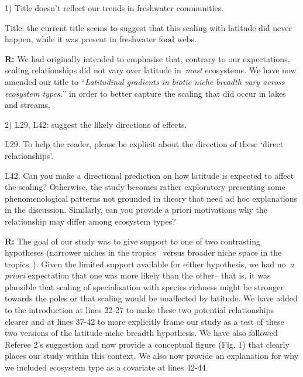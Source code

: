 \documentclass[12pt]{letter}
\newenvironment{refquote}{\bigskip \begin{it}}{\end{it}\smallskip}
\newcommand{\mytitle}{\emph{Latitudinal gradients in biotic niche breadth vary across ecosystem types.}}
\begin{document}
  1) Title doesn't reflect our trends in freshwater communities.

  \begin{refquote}

    Title: the current title seems to suggest that this scaling with latitude
    did never happen, while it was present in freshwater food webs.

  \end{refquote}


  \textbf{R:} We had originally intended to emphasise that, contrary to our expectations,
  scaling relationships did not vary over latitude in~\emph{most} ecosystems. We have now amended our
  title to ``\mytitle'' in order to better capture the scaling that did occur in lakes and streams.


  2) L29, L42: suggest the likely directions of effects.

  \begin{refquote}

    L29. To help the reader, please be explicit about the direction of these ‘direct relationships’.

    \smallskip

    L42. Can you make a directional prediction on how latitude is expected to
    affect the scaling? Otherwise, the study becomes rather exploratory
    presenting some phenomenological patterns not grounded in theory that need
    ad hoc explanations in the discussion. Similarly, can you provide a priori
    motivations why the relationship may differ among ecosystem types?

  \end{refquote}


  \textbf{R:} The goal of our study was to give support to
  one of two contrasting hypotheses (narrower niches in the
  tropics~\cite{Vazquez2004} versus broader niche space in 
  the tropics~\cite{Davies2007}). Given the limited support
  available for either hypothesis, we had no~\emph{a priori}
  expectation that one was more likely than the other-- that
  is, it was plausible that scaling of specialisation with
  species richness might be stronger towards the poles or 
  that scaling would be unaffected by latitude. We have 
  added to the introduction at lines 22-27 to make these two
  potential relationships clearer and at lines 37-42 to more
  explicitly frame our study as a test of these two versions 
  of the latitude-niche breadth hypothesis. We have also 
  followed Referee 2's suggestion and now provide a 
  conceptual figure (Fig. 1) that clearly places our study
  within this context. We also now provide an explanation 
  for why we included ecosystem type as a covariate at lines
  42-44.
 
\end{document}
